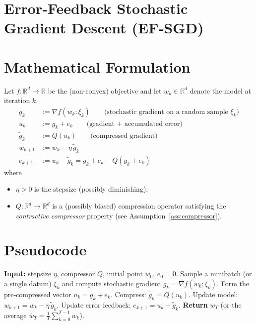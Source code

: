 \documentclass{article}
\newcommand{\R}{\mathbb{R}}
\begin{document}
\section*{Error‑Feedback Stochastic Gradient Descent (EF‑SGD)}

\section*{Mathematical Formulation}
Let $f:\R^{d}\to\R$ be the (non‑convex) objective and let $w_{k}\in\R^{d}$ denote the model at iteration $k$.
\begin{align}
    g_{k} &:= \nabla f(w_{k};\xi_{k}) \qquad\text{(stochastic gradient on a random sample }\xi_{k})\\[4pt]
    u_{k} &:= g_{k}+e_{k} \qquad\text{(gradient + accumulated error)}\\[4pt]
    \tilde g_{k} &:= Q(u_{k}) \qquad\text{(compressed gradient)}\\[4pt]
    w_{k+1} &:= w_{k}-\eta\,\tilde g_{k}\label{eq:update}\\[4pt]
    e_{k+1} &:= u_{k}-\tilde g_{k}=g_{k}+e_{k}-Q(g_{k}+e_{k})\label{eq:error}
\end{align}
where
\begin{itemize}
    \item $\eta>0$ is the stepsize (possibly diminishing);
    \item $Q:\R^{d}\to\R^{d}$ is a (possibly biased) compression operator satisfying the \emph{contractive compressor} property (see Assumption~\ref{ass:compressor}).
\end{itemize}

\section*{Pseudocode}
\begin{algorithm}[H]
\caption{EF‑SGD}
\begin{algorithmic}[1]
\STATE \textbf{Input:} stepsize $\eta$, compressor $Q$, initial point $w_{0}$, $e_{0}=0$.
    \STATE Sample a minibatch (or a single datum) $\xi_{k}$ and compute stochastic gradient $g_{k}=\nabla f(w_{k};\xi_{k})$.
    \STATE Form the pre‑compressed vector $u_{k}=g_{k}+e_{k}$.
    \STATE Compress: $\tilde g_{k}=Q(u_{k})$.
    \STATE Update model: $w_{k+1}=w_{k}-\eta\,\tilde g_{k}$.
    \STATE Update error feedback: $e_{k+1}=u_{k}-\tilde g_{k}$.
\ENDFOR
\STATE \textbf{Return} $w_{T}$ (or the average $\bar w_{T}=\frac1T\sum_{k=0}^{T-1}w_{k}$).
\end{algorithmic}
\end{algorithm}
\end{document}
